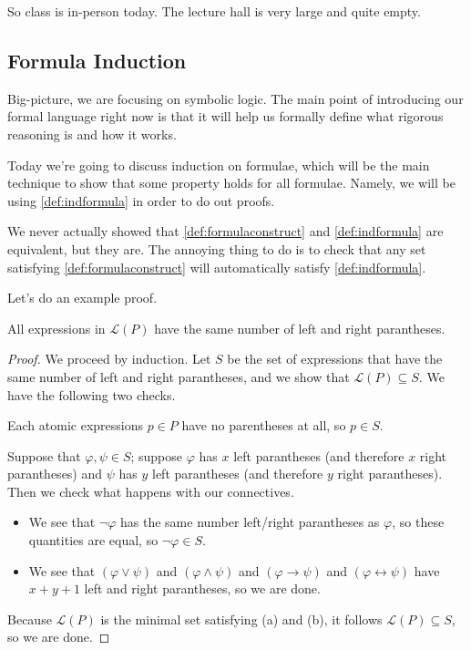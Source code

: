 
So class is in-person today. The lecture hall is very large and quite empty.

\subsection{Formula Induction}
Big-picture, we are focusing on symbolic logic. The main point of introducing our formal language right now is that it will help us formally define what rigorous reasoning is and how it works.

Today we're going to discuss induction on formulae, which will be the main technique to show that some property holds for all formulae. Namely, we will be using \autoref{def:indformula} in order to do out proofs.
\begin{remark}
	We never actually showed that \autoref{def:formulaconstruct} and \autoref{def:indformula} are equivalent, but they are. The annoying thing to do is to check that any set satisfying \autoref{def:formulaconstruct} will automatically satisfy \autoref{def:indformula}.
\end{remark}
Let's do an example proof.
\begin{proposition}
	All expressions in $\mathcal L(P)$ have the same number of left and right parantheses.
\end{proposition}
\begin{proof}
	We proceed by induction. Let $S$ be the set of expressions that have the same number of left and right parantheses, and we show that $\mathcal L(P)\subseteq S$. We have the following two checks.
	\begin{listalph}
		\item Each atomic expressions $p\in P$ have no parentheses at all, so $p\in S$.
		\item Suppose that $\varphi,\psi\in S$; suppose $\varphi$ has $x$ left parantheses (and therefore $x$ right parantheses) and $\psi$ has $y$ left parantheses (and therefore $y$ right parantheses). Then we check what happens with our connectives.
		\begin{itemize}
			\item We see that $\lnot\varphi$ has the same number left/right parantheses as $\varphi$, so these quantities are equal, so $\lnot\varphi\in S$.
			\item We see that $(\varphi\lor\psi)$ and $(\varphi\land\psi)$ and $(\varphi\to\psi)$ and $(\varphi\leftrightarrow\psi)$ have $x+y+1$ left and right parantheses, so we are done.
		\end{itemize}
	\end{listalph}
	Because $\mathcal L(P)$ is the minimal set satisfying (a) and (b), it follows $\mathcal L(P)\subseteq S$, so we are done.
\end{proof}
